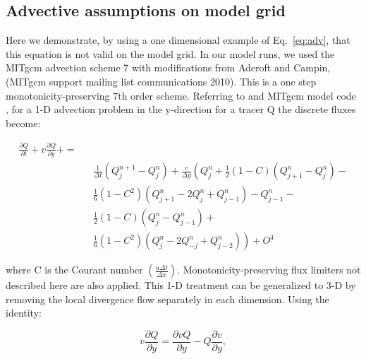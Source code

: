 \documentclass[a4paper,12pt, openright, titlepage]{book}
\renewcommand\thesection{\arabic{chapter}.\arabic{section}}
\begin{document}
\printacronyms
\printglossary[type=symbolslist,style=symbunitlong]   %
\printglossary[type=main]                     %

\singlespacing

\begin{appendices}
\renewcommand{\thesection}{\Alph{section}}
\section{Advective assumptions on model grid}
\label{sec:appendix1}




Here we demonstrate, by using a one dimensional example of Eq.~\ref{eq:adv}, that this equation is not valid on the model grid. In our model runs, we used the MITgcm advection scheme 7 \citep{Daru2004} with modifications from Adcroft and Campin, (MITgcm support mailing list communications 2010). This is a one step monotonicity-preserving 7th order scheme. Referring to \citet{Adcroft2004} and MITgcm model code \citep{marshall1997}, for a 1-D advection problem in the y-direction for a tracer Q the discrete fluxes become:

\begin{eqnarray}\nonumber
\nonumber \frac{\partial Q}{\partial t} + v\frac{\partial Q}{\partial y} +  = \\
\nonumber &&  \frac{1}{\Delta t} \left( Q_j ^{n+1} - Q_j ^{n} \right) + \frac{v}{\Delta y} \left(  Q_j ^n + \frac{1}{2} (1-C)(Q_{j+1} ^{n} - Q_j ^{n})  - \right. \nonumber  \\ 
&& \left. \frac{1}{6}  (1-C^2 )(Q_{j+1} ^{n} - 2Q_j ^{n} + Q_{j-1} ^{n} ) - Q_{j-1} ^n - \right. \\ 
\nonumber && \left. \frac{1}{2} (1-C)(Q_{j} ^{n} - Q_{j-1} ^{n})  + \right. \\  \nonumber  
&& \left. \frac{1}{6}  (1-C^2 )(Q_{j} ^{n} - 2Q_{-j} ^{n} + Q_{j-2} ^{n} )
\right) + O^4
\label{EQ:osmp7}
\end{eqnarray}

where C is the Courant number $\displaystyle{\left( \frac{u \Delta t }{\Delta x} \right) }$. Monotonicity-preserving flux limiters not described here are also applied. This 1-D treatment can be generalized to 3-D by removing the local divergence flow separately in each dimension. Using the identity:

\begin{equation}
v \frac{\partial Q}{\partial y} =\frac{\partial v Q}{\partial y} - Q \frac{\partial v}{\partial y},
\end{equation}


\end{appendices}
\end{document}
